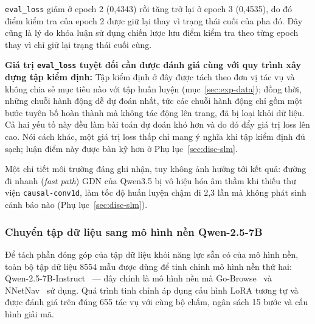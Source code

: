 \texttt{eval\_loss} giảm ở epoch 2 (0{,}4343) rồi tăng trở lại ở epoch 3 (0{,}4535), do đó điểm kiểm tra của epoch 2 được giữ lại thay vì trạng thái cuối của pha đó. Đây cũng là lý do khóa luận sử dụng chiến lược lưu điểm kiểm tra theo từng epoch thay vì chỉ giữ lại trạng thái cuối cùng.

\textbf{Giá trị \texttt{eval\_loss} tuyệt đối cần được đánh giá cùng với quy trình xây dựng tập kiểm định:} Tập kiểm định ở đây được tách theo đơn vị tác vụ và không chia sẻ mục tiêu nào với tập huấn luyện (mục~\ref{sec:exp-data}); đồng thời, những chuỗi hành động dễ dự đoán nhất, tức các chuỗi hành động chỉ gồm một bước tuyên bố hoàn thành mà không tác động lên trang, đã bị loại khỏi dữ liệu. Cả hai yếu tố này đều làm bài toán dự đoán khó hơn và do đó đẩy giá trị loss lên cao. Nói cách khác, một giá trị loss thấp chỉ mang ý nghĩa khi tập kiểm định đủ sạch; luận điểm này được bàn kỹ hơn ở Phụ lục~\ref{sec:disc-slm}.

Một chi tiết môi trường đáng ghi nhận, tuy không ảnh hưởng tới kết quả: đường đi nhanh (\emph{fast path}) GDN của Qwen3.5 bị vô hiệu hóa âm thầm khi thiếu thư viện \texttt{causal-conv1d}, làm tốc độ huấn luyện chậm đi 2{,}3 lần mà không phát sinh cảnh báo nào (Phụ lục~\ref{sec:disc-slm}).

\subsubsection{Chuyển tập dữ liệu sang mô hình nền Qwen-2.5-7B}

\label{sec:exp-backbone}

Để tách phần đóng góp của tập dữ liệu khỏi năng lực sẵn có của mô hình nền, toàn bộ tập dữ liệu 8554 mẫu được dùng để tinh chỉnh mô hình nền thứ hai: Qwen-2.5-7B-Instruct~\cite{qwen2024qwen25} — đây chính là mô hình nền mà Go-Browse~\cite{gandhi2026gobrowse} và NNetNav~\cite{murty2024nnetnav} sử dụng. Quá trình tinh chỉnh áp dụng cấu hình LoRA tương tự và được đánh giá trên đúng 655 tác vụ với cùng bộ chấm, ngân sách 15 bước và cấu hình giải mã.

